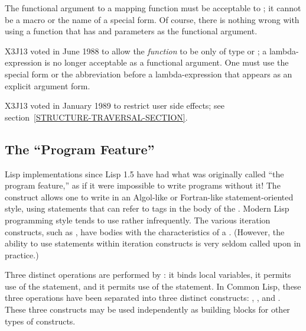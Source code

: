 \begin{defun}[Function]
The functional argument to a mapping function must be acceptable
to ; it cannot be a macro or the name of a special form.
Of course, there is nothing wrong with using a function that has 
and  parameters as the functional argument.

\begin{newer}
X3J13 voted in June 1988  to allow the {\it function}
to be only of type  or ; a lambda-expression
is no longer acceptable as a functional argument.  One must use the
 special form or the abbreviation  before
a lambda-expression that appears as an  explicit argument form.
\end{newer}

\begin{new}
X3J13 voted in January 1989
to restrict user side effects; see section~\ref{STRUCTURE-TRAVERSAL-SECTION}.
\end{new}
\end{defun}

\subsection{The ``Program Feature''}

Lisp implementations since Lisp 1.5 have had what was originally
called ``the program feature,'' as if it were impossible to write
programs without it!  The  construct allows one to
write in an Algol-like or Fortran-like statement-oriented
style, using  statements that can refer to tags in the
body of the .  Modern Lisp programming style tends to use
 rather infrequently.  The various iteration constructs,
such as , have bodies with the characteristics of a .
(However, the ability to use  statements within iteration
constructs is very seldom called upon in practice.)

Three distinct operations are performed by : it binds local variables,
it permits use of the  statement, and it permits use of the 
statement.
In Common Lisp, these three operations have been separated into three
distinct constructs: , , and .
These three constructs may be used independently as building blocks
for other types of constructs.

